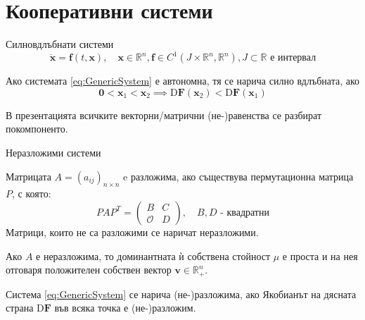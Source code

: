 \section{Кооперативни системи}
\begin{frame}[t]{Силновдлъбнати системи}
  \begin{equation}
    \label{eq:GenericSystem}
    \dot{\boldsymbol{x}} = \boldsymbol{f}(t, \boldsymbol{x}),  \quad \boldsymbol{x} \in \mathbb{R}^n, \boldsymbol{f} \in C^1(J \times \mathbb{R}^n, \mathbb{R}^n), J \subset \mathbb{R} \text{ е интервал}
    \end{equation}

\begin{definition}
  Ако системата \ref{eq:GenericSystem} е автономна, тя се нарича силно вдлъбната, ако
  \begin{equation}
    \boldsymbol{0} < \boldsymbol{x}_1 < \boldsymbol{x}_2 \implies \mathrm{D}\boldsymbol{F}(\boldsymbol{x}_2) < \mathrm{D}\boldsymbol{F}(\boldsymbol{x}_1)
    \end{equation}
  \end{definition}

  \begin{nota-bene}
    В презентацията всичките векторни/матрични (не-)равенства се разбират покомпоненто.
  \end{nota-bene}
\end{frame}

\begin{frame}[t]{Неразложими системи}
  \begin{definition}
    Матрицата $A=(a_{ij})_{n \times n}$ e разложима, ако съществува пермутационна матрица $P$, с която:
    \begin{equation*}
      PAP^T =
      \begin{pmatrix}
        B & C \\
        \mathscr{O} & D
      \end{pmatrix}, \quad B, D \text{ - квадратни}
    \end{equation*}
    Матрици, които не са разложими се наричат неразложими.
  \end{definition}
  \begin{theorem}
    Ако $A$ е неразложима, то доминантната ѝ собствена стойност $\mu$ е проста и на нея отговаря положителен собствен вектор $\boldsymbol{v} \in \mathbb{R}_{+}^n$.
  \end{theorem}
  \begin{definition}
    Система \ref{eq:GenericSystem} се нарича (не-)разложима, ако Якобианът на дясната страна $\mathrm{D}\boldsymbol{F}$ във всяка точка е (не-)разложим.
  \end{definition}
  
\end{frame}

